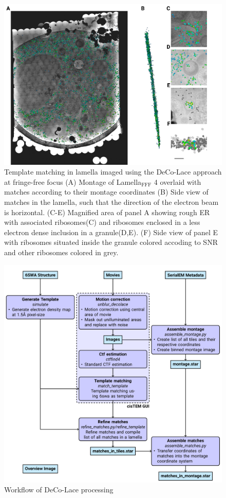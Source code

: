\documentclass[
]{article}
\begin{document}
\begin{figure}
\hypertarget{fig:matching_fff}{%
\centering
\includegraphics{figures/matching_fff.png}
\caption{Template matching in lamella imaged using the DeCo-Lace approach at fringe-free
focus (A) Montage of Lamella\(_\textrm{FFF}\) 4 overlaid with matches according to
their montage coordinates (B) Side view of matches in the lamella, such that the
direction of the electron beam is horizontal. (C-E) Magnified area of panel A
showing rough ER with associated ribosomes(C) and ribosomes
enclosed in a less electron dense inclusion in a granule(D,E). (F) Side view of
panel E with ribosomes situated inside the granule colored accoding
to SNR and other ribosomes colored in grey.}\label{fig:matching_fff}
}
\end{figure}

\begin{figure}
\hypertarget{fig:deco_lace_workflow}{%
\centering
\includegraphics{figures/deco_lace_workflow.png}
\caption{Workflow of DeCo-Lace processing}\label{fig:deco_lace_workflow}
}
\end{figure}
\end{document}
